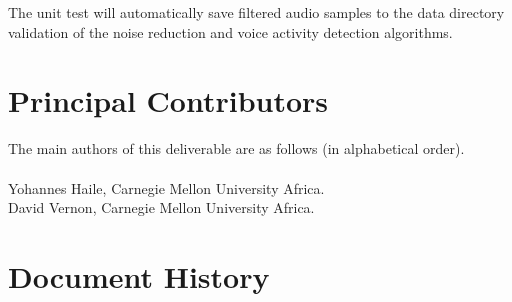 \documentclass{CSSRforAfrica}
\newcommand{\blank}{~\\}
\begin{document}
The unit test will automatically save filtered audio samples to the data directory validation of the noise reduction and voice activity detection algorithms.

\newpage


\pagebreak
\section*{Principal Contributors}
\label{contributors}
The main authors of this deliverable are as follows (in alphabetical order).
\blank
~
\blank
Yohannes Haile, Carnegie Mellon University Africa.\\    %
David Vernon, Carnegie Mellon University Africa. \\                                                                           %
 

  
\newpage
\section*{Document History}
\label{document_history}
\end{document}

